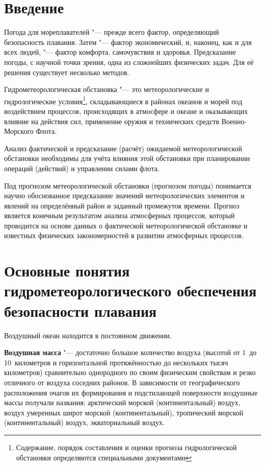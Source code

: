 \documentclass[a4paper, 12pt, twoside, final, book, russian, fittopage, cyremdash, openright]{ncc}
\begin{document}


\frontmatter

\openrightorany

{\small \tableofcontents}
{\small \listoffigures}
{\small \listoftables}

\openrightorany

\chapter*{Введение}

Погода для мореплавателей "--- прежде всего фактор, определяющий
безопасность плавания. Затем "--- фактор экономический, и, наконец,
как и для всех людей, "--- фактор комфорта, самочувствия и
здоровья. Предсказание погоды, с научной точки зрения, одна из
сложнейших физических задач. Для её решения существует несколько
методов.

Гидрометеорологическая обстановка "--- это метеорологические и
гидрологические условия\footnote{Содержание, порядок составления и
  оценки прогноза гидрологической обстановки определяются специальными
  документами}, складывающиеся в районах океанов и морей под
воздействием процессов, происходящих в атмосфере и океане и
оказывающих влияние на действия сил, применение оружия и технических
средств Военно-Морского Флота.

Анализ фактической и предсказание (расчёт) ожидаемой метеорологической
обстановки необходимы для учёта влияния этой обстановки при
планировании операций (действий) и управлении силами флота.

Под прогнозом метеорологической обстановки (прогнозом погоды)
понимается научно обоснованное предсказание значений метеорологических
элементов и явлений на определённый район и заданный промежуток
времени. Прогноз является конечным результатом анализа атмосферных
процессов, который проводится на основе данных о фактической
метеорологической обстановке и известных физических закономерностей в
развитии атмосферных процессов.

\mainmatter

\chapter{Основные понятия гидрометеорологического обеспечения безопасности плавания}

Воздушный океан находится в постоянном движении.

\textbf{Воздушная масса} "--- достаточно
большое количество воздуха (высотой от 1~до 10~километров и
горизонтальной протяжённостью до нескольких тысяч километров)
сравнительно однородного по своим физическим свойствам и резко
отличного от воздуха соседних районов. В зависимости от
географического расположения очагов их формирования и подстилающей
поверхности воздушные массы получали названия: арктический морской
(континентальный) воздух, воздух умеренных широт морской
(континентальный), тропический морской (континентальный) воздух,
экваториальный воздух.
\end{document}
